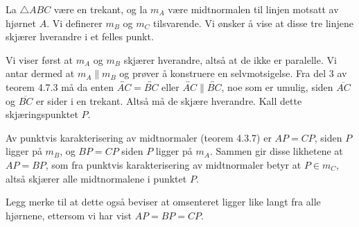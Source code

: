 
\begin{oppgave}[5.6.5]
    La $\triangle ABC$ være en trekant, og la $m_A$ være midtnormalen til linjen motsatt av hjørnet $A$. 
    Vi definerer $m_B$ og $m_C$ tilsvarende. 
    Vi ønsker å vise at disse tre linjene skjærer hverandre i et felles punkt. 

    Vi viser først at $m_A$ og $m_B$ skjærer hverandre, altså at de ikke er paralelle. 
    Vi antar dermed at $m_A\parallel m_B$ og prøver å konstruere en selvmotsigelse. 
    Fra del 3 av teorem 4.7.3  må da enten $\overleftrightarrow{AC}=\overleftrightarrow{BC}$ eller $\overleftrightarrow{AC}\parallel \overleftrightarrow{BC}$, noe som er umulig, siden $\overline{AC}$ og $\overline{BC}$ er sider i en trekant. 
    Altså må de skjære hverandre. 
    Kall dette skjæringspunktet $P$. 

    Av punktvis karakterisering av midtnormaler (teorem 4.3.7) er $AP=CP$, siden $P$ ligger på $m_B$, og $BP=CP$ siden $P$ ligger på $m_A$. 
    Sammen gir disse likhetene at $AP=BP$, som fra punktvis karakterisering av midtnormaler betyr at $P\in m_C$, altså skjærer alle midtnormalene i punktet $P$. 

    Legg merke til at dette også beviser at omsenteret ligger like langt fra alle hjørnene, ettersom vi har vist $AP=BP=CP$. 
\end{oppgave}


